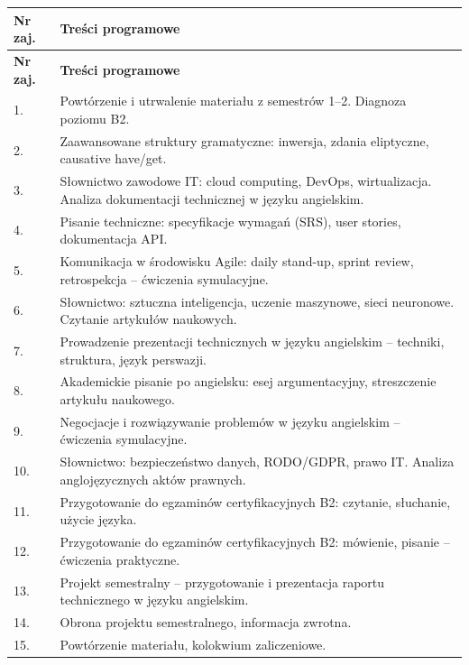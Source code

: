 \documentclass[12pt, a4paper]{article}
\newcommand{\thdrule}{\noalign{\global\setlength{\extrarowheight}{0pt}}}
\newcommand{\thdend}{\noalign{\global\setlength{\extrarowheight}{3pt}}}
\begin{document}
{\scriptsize
\begin{longtable}{m{1.5cm}m{14.5cm}}
\thdrule\toprule
\rowcolor{pjatkRed} {\color{white}\textbf{Nr zaj.}} & {\color{white}\textbf{Treści programowe}} \\
\midrule\thdend
\endfirsthead
\thdrule\toprule
\rowcolor{pjatkRed} {\color{white}\textbf{Nr zaj.}} & {\color{white}\textbf{Treści programowe}} \\
\midrule\thdend
\endhead
  \rowcolor{tableRowLight} 1. & Powtórzenie i utrwalenie materiału z semestrów 1–2. Diagnoza poziomu B2. \\
  \rowcolor{tableRowAlt} 2. & Zaawansowane struktury gramatyczne: inwersja, zdania eliptyczne, causative have/get. \\
  \rowcolor{tableRowLight} 3. & Słownictwo zawodowe IT: cloud computing, DevOps, wirtualizacja. Analiza dokumentacji technicznej w języku angielskim. \\
  \rowcolor{tableRowAlt} 4. & Pisanie techniczne: specyfikacje wymagań (SRS), user stories, dokumentacja API. \\
  \rowcolor{tableRowLight} 5. & Komunikacja w środowisku Agile: daily stand-up, sprint review, retrospekcja – ćwiczenia symulacyjne. \\
  \rowcolor{tableRowAlt} 6. & Słownictwo: sztuczna inteligencja, uczenie maszynowe, sieci neuronowe. Czytanie artykułów naukowych. \\
  \rowcolor{tableRowLight} 7. & Prowadzenie prezentacji technicznych w języku angielskim – techniki, struktura, język perswazji. \\
  \rowcolor{tableRowAlt} 8. & Akademickie pisanie po angielsku: esej argumentacyjny, streszczenie artykułu naukowego. \\
  \rowcolor{tableRowLight} 9. & Negocjacje i rozwiązywanie problemów w języku angielskim – ćwiczenia symulacyjne. \\
  \rowcolor{tableRowAlt} 10. & Słownictwo: bezpieczeństwo danych, RODO/GDPR, prawo IT. Analiza anglojęzycznych aktów prawnych. \\
  \rowcolor{tableRowLight} 11. & Przygotowanie do egzaminów certyfikacyjnych B2: czytanie, słuchanie, użycie języka. \\
  \rowcolor{tableRowAlt} 12. & Przygotowanie do egzaminów certyfikacyjnych B2: mówienie, pisanie – ćwiczenia praktyczne. \\
  \rowcolor{tableRowLight} 13. & Projekt semestralny – przygotowanie i prezentacja raportu technicznego w języku angielskim. \\
  \rowcolor{tableRowAlt} 14. & Obrona projektu semestralnego, informacja zwrotna. \\
  \rowcolor{tableRowLight} 15. & Powtórzenie materiału, kolokwium zaliczeniowe. \\
\bottomrule
\end{longtable}}
\end{document}
